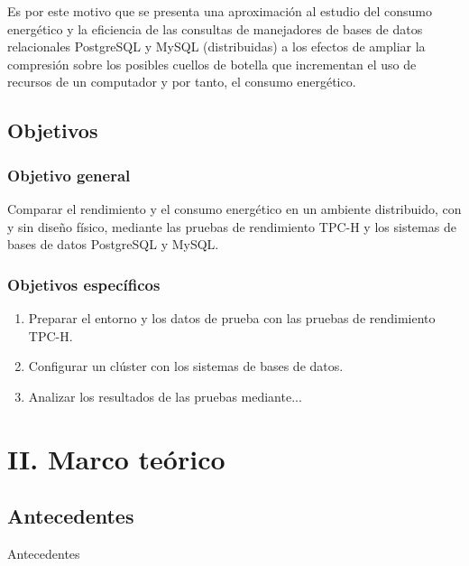 \documentclass[12pt, letter paper]{report}
\begin{document}
        Es por este motivo que se presenta una aproximación al estudio del
        consumo energético y la eficiencia de las consultas de manejadores de
        bases de datos relacionales PostgreSQL y MySQL (distribuidas) a los
        efectos de ampliar la compresión sobre los posibles cuellos de botella
        que incrementan el uso de recursos de un computador y por tanto, el
        consumo energético.

    \section{Objetivos} %
    \label{sec:objetivos}
      \subsection{Objetivo general} %
      \label{sub:objetivo_general}
        Comparar el rendimiento y el consumo energético en un ambiente
        distribuido, con y sin diseño físico, mediante las pruebas de
        rendimiento TPC-H y los sistemas de bases de datos PostgreSQL y MySQL.

      \subsection{Objetivos específicos} %
      \label{sub:objetivos_específicos}
        \begin{enumerate}
          \item Preparar el entorno y los datos de prueba con las pruebas de
          rendimiento TPC-H.
          \item Configurar un clúster con los sistemas de bases de datos.
          \item Analizar los resultados de las pruebas mediante...
        \end{enumerate}

  \chapter{II. Marco teórico} %
  \label{cha:ii_marco_teórico}
    \section{Antecedentes} %
    \label{sec:antecedentes}
      Antecedentes
\end{document}
